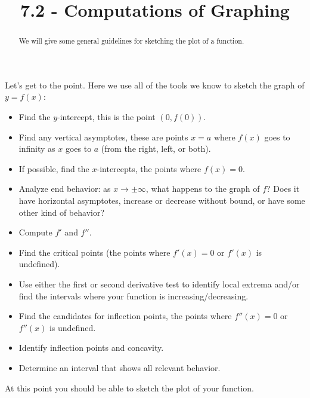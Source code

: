 \documentclass[wordchoicegiven]{ximera}
\title{7.2 - Computations of Graphing}
\begin{document}
\begin{abstract}
  We will give some general guidelines for sketching the plot of a
  function.
\end{abstract}
\maketitle

Let's get to the point. Here we use all of the tools we know to sketch
the graph of $y=f(x)$:

\begin{itemize}
\item Find the $y$-intercept, this is the point $(0,f(0))$. 
\item Find any vertical asymptotes, these are points $x=a$ where
  $f(x)$ goes to infinity as $x$ goes to $a$ (from the right, left, or
  both).
  \item If possible, find the $x$-intercepts, the points where $f(x) =
  0$. 
\item Analyze end behavior:  as $x \to \pm \infty$, what happens to the graph of $f$?  Does it  have horizontal asymptotes, increase or decrease without bound, or have some other kind of behavior?
\item Compute $f'$ and $f''$.
\item Find the critical points (the points where $f'(x) = 0$ or
  $f'(x)$ is undefined).
\item Use either the first or second derivative test to identify local extrema and/or
  find the intervals where your function is increasing/decreasing.
\item Find the candidates for inflection points, the points where
  $f''(x) = 0$ or $f''(x)$ is undefined.
\item Identify inflection points and concavity.

\item Determine an interval that shows all relevant behavior.
\end{itemize}
At this point you should be able to sketch the plot of your function.
\end{document}
